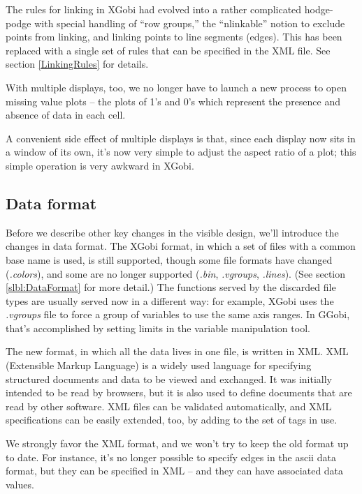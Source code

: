 \documentclass[11pt]{article}
\begin{document}
The rules for linking in XGobi had evolved into a rather complicated
hodge-podge with special handling of ``row groups,'' the
``nlinkable'' notion to exclude points from linking, and linking
points to line segments (edges).  This has been replaced with a single set
of rules that can be specified in the XML file.  See section 
\ref{LinkingRules} for details.

With multiple displays, too, we no longer have to launch a new
process to open missing value plots -- the plots of 1's and 0's
which represent the presence and absence of data in each cell.

A convenient side effect of multiple displays is that, since each
display now sits in a window of its own, it's now very simple to
adjust the aspect ratio of a plot; this simple operation is very
awkward in XGobi.

\subsection {Data format}

Before we describe other key changes in the visible design, we'll
introduce the changes in data format.  The XGobi format, in which a
set of files with a common base name is used, is still supported,
though some file formats have changed ({\em .colors}), and some are no
longer supported ({\em .bin}, {\em .vgroups}, {\em .lines}).  (See
section \ref{slbl:DataFormat} for more detail.) The functions served
by the discarded file types are usually served now in a different
way:  for example, XGobi uses the {\em .vgroups} file to force
a group of variables to use the same axis ranges.  In GGobi, that's
accomplished by setting limits in the variable manipulation tool.

The new format, in which all the data lives in one file, is written
in XML.  XML (Extensible Markup Language) is a widely used language
for specifying structured documents and data to be viewed and
exchanged.  It was initially intended to be read by browsers, but it
is also used to define documents that are read by other software.
XML files can be validated automatically, and XML specifications can
be easily extended, too, by adding to the set of tags in use.

We strongly favor the XML format, and we won't try to keep the
old format up to date.  For instance, it's no longer possible
to specify edges in the ascii data format, but they can be specified in
XML -- and they can have associated data values.
\end{document}
